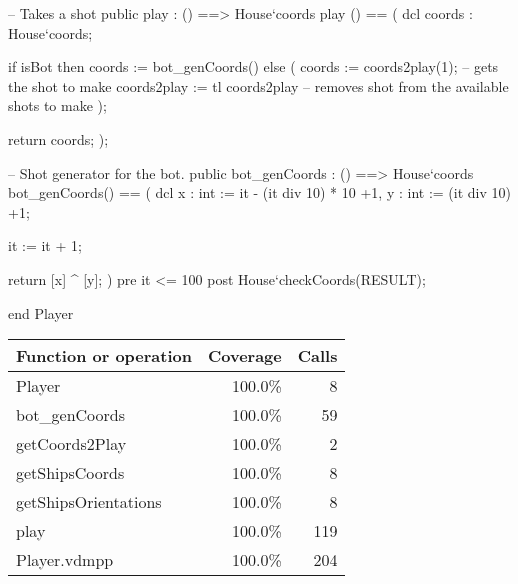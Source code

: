 \begin{vdm_al}
  -- Takes a shot
  public play : () ==> House`coords
   play () ==
   (
    dcl coords : House`coords;
    
    if isBot then coords := bot_genCoords()
    else (
     coords := coords2play(1); -- gets the shot to make
     coords2play := tl coords2play -- removes shot from the available shots to make
    );
    
    return coords;
   );

  -- Shot generator for the bot.
  public bot_genCoords : () ==> House`coords
   bot_genCoords() ==
   (
    dcl x : int := it - (it div 10) * 10 +1,
     y : int := (it div 10) +1;
    
    it := it + 1;
    
    return [x] ^ [y];
   )
   pre it <= 100
   post House`checkCoords(RESULT);

end Player
\end{vdm_al}
\bigskip
\begin{longtable}{|l|r|r|}
\hline
Function or operation & Coverage & Calls \\
\hline
\hline
Player & 100.0\% & 8 \\
\hline
bot\_genCoords & 100.0\% & 59 \\
\hline
getCoords2Play & 100.0\% & 2 \\
\hline
getShipsCoords & 100.0\% & 8 \\
\hline
getShipsOrientations & 100.0\% & 8 \\
\hline
play & 100.0\% & 119 \\
\hline
\hline
Player.vdmpp & 100.0\% & 204 \\
\hline
\end{longtable}

